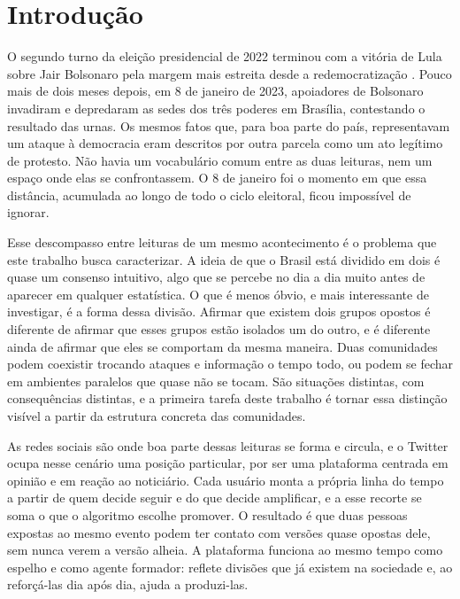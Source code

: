 \documentclass[conference]{IEEEtran}
\begin{document}
\section{Introdução}
O segundo turno da eleição presidencial de 2022 terminou com a vitória de Lula sobre Jair Bolsonaro pela margem mais estreita desde a redemocratização \cite{b_interian2023}. Pouco mais de dois meses depois, em 8 de janeiro de 2023, apoiadores de Bolsonaro invadiram e depredaram as sedes dos três poderes em Brasília, contestando o resultado das urnas. Os mesmos fatos que, para boa parte do país, representavam um ataque à democracia eram descritos por outra parcela como um ato legítimo de protesto. Não havia um vocabulário comum entre as duas leituras, nem um espaço onde elas se confrontassem. O 8 de janeiro foi o momento em que essa distância, acumulada ao longo de todo o ciclo eleitoral, ficou impossível de ignorar.

Esse descompasso entre leituras de um mesmo acontecimento é o problema que este trabalho busca caracterizar. A ideia de que o Brasil está dividido em dois é quase um consenso intuitivo, algo que se percebe no dia a dia muito antes de aparecer em qualquer estatística. O que é menos óbvio, e mais interessante de investigar, é a forma dessa divisão. Afirmar que existem dois grupos opostos é diferente de afirmar que esses grupos estão isolados um do outro, e é diferente ainda de afirmar que eles se comportam da mesma maneira. Duas comunidades podem coexistir trocando ataques e informação o tempo todo, ou podem se fechar em ambientes paralelos que quase não se tocam. São situações distintas, com consequências distintas, e a primeira tarefa deste trabalho é tornar essa distinção visível a partir da estrutura concreta das comunidades.

As redes sociais são onde boa parte dessas leituras se forma e circula, e o Twitter ocupa nesse cenário uma posição particular, por ser uma plataforma centrada em opinião e em reação ao noticiário. Cada usuário monta a própria linha do tempo a partir de quem decide seguir e do que decide amplificar, e a esse recorte se soma o que o algoritmo escolhe promover. O resultado é que duas pessoas expostas ao mesmo evento podem ter contato com versões quase opostas dele, sem nunca verem a versão alheia. A plataforma funciona ao mesmo tempo como espelho e como agente formador: reflete divisões que já existem na sociedade e, ao reforçá-las dia após dia, ajuda a produzi-las.
\end{document}
